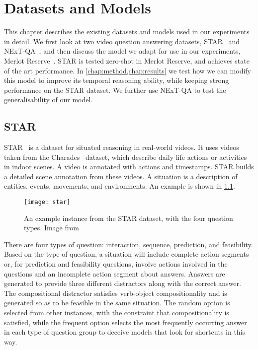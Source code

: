 \chapter{Datasets and Models}
\label{chap:dataset}

This chapter describes the existing datasets and models used in our experiments
in detail.  We first look at two video question answering datasets,
STAR~\citep{wu2021star} and NExT-QA~\citep{xiao2021nextqa}, and then discuss the
model we adapt for use in our experiments, Merlot
Reserve~\citep{zellers2022mreserve}. STAR is tested zero-shot in Merlot Reserve,
and achieves state of the art performance. In \cref{chap:method,chap:results}
we test how we can modify this model to improve its temporal reasoning ability,
while keeping strong performance on the STAR dataset. We further use NExT-QA to
test the generalisability of our model.

\section{STAR}

STAR~\citep{wu2021star} is a dataset for situated reasoning in real-world videos.
It uses videos taken from the Charades~\citep{sigurdsson2016charades} dataset,
which describe daily life actions or activities in indoor scenes. A video
is annotated with actions and timestamps. STAR builds a detailed scene annotation
from these videos. A situation is a description of entities, events, movements,
and environments. An example is shown in \cref{fig:star}.

\begin{figure}[htpb]
	\centering
	\texttt{[image: star]}
	\caption{An example instance from the STAR dataset, with the four question
		types. Image from~\citet{wu2021star}}
	\label{fig:star}
\end{figure}

There are four types of question: interaction, sequence, prediction, and
feasibility.  Based on the type of question, a situation will include complete
action segments or, for prediction and feasibility questions, involve actions
involved in the questions and an incomplete action segment about answers.
Answers are generated to provide three different distractors along with the
correct answer. The compositional distractor satisfies verb-object
compositionality and is generated so as to be feasible in the same situation.
The random option is selected from other instances, with the constraint that
compositionality is satisfied, while the frequent option selects the most
frequently occurring answer in each type of question group to deceive models
that look for shortcuts in this way.

